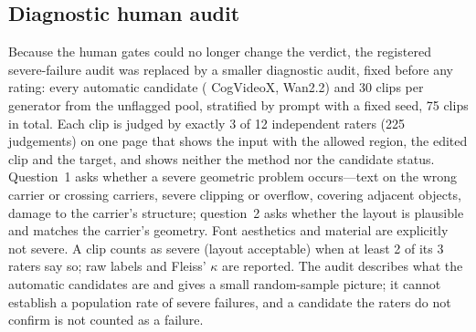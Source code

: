 \subsection{Diagnostic human audit}
\label{sec:supp_g4_audit}
Because the human gates could no longer change the verdict, the registered severe-failure audit was replaced by a smaller diagnostic audit, fixed before any rating: every automatic candidate (\gTCogSevere{} CogVideoX, \gTWanSevere{} Wan2.2) and 30 clips per generator from the unflagged pool, stratified by prompt with a fixed seed, 75 clips in total. Each clip is judged by exactly 3 of 12 independent raters (225 judgements) on one page that shows the input with the allowed region, the edited clip and the target, and shows neither the method nor the candidate status. Question~1 asks whether a severe geometric problem occurs---text on the wrong carrier or crossing carriers, severe clipping or overflow, covering adjacent objects, damage to the carrier's structure; question~2 asks whether the layout is plausible and matches the carrier's geometry. Font aesthetics and material are explicitly not severe. A clip counts as severe (layout acceptable) when at least 2 of its 3 raters say so; raw labels and Fleiss' $\kappa$ are reported. The audit describes what the automatic candidates are and gives a small random-sample picture; it cannot establish a population rate of severe failures, and a candidate the raters do not confirm is not counted as a failure. 
